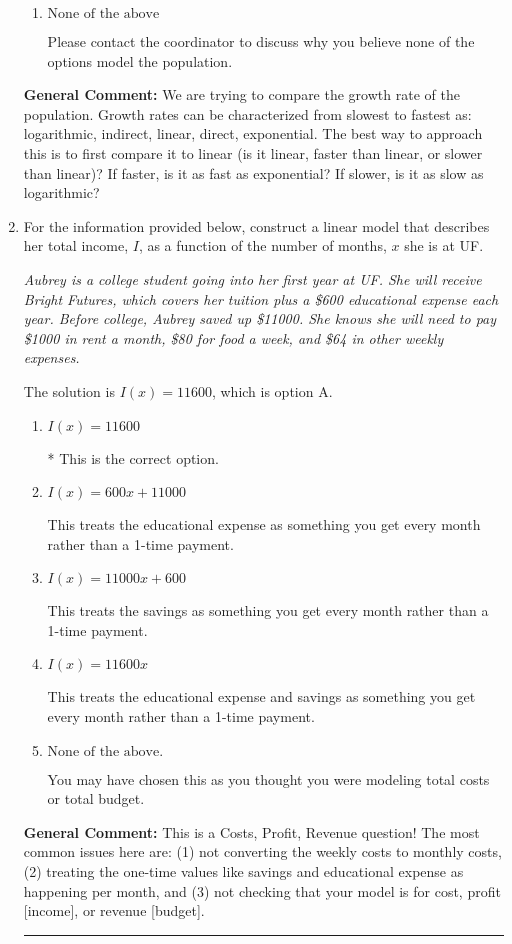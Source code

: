 \documentclass{extbook}[14pt]
\newcommand{\litem}[1]{\item #1

\rule{\textwidth}{0.4pt}}
\begin{document}
\begin{enumerate}
{\begin{enumerate}[label=\Alph*.]
This suggests the fastest of growths that we know.
\item \( \text{None of the above} \)

Please contact the coordinator to discuss why you believe none of the options model the population.
\end{enumerate}

\textbf{General Comment:} We are trying to compare the growth rate of the population. Growth rates can be characterized from slowest to fastest as: logarithmic, indirect, linear, direct, exponential. The best way to approach this is to first compare it to linear (is it linear, faster than linear, or slower than linear)? If faster, is it as fast as exponential? If slower, is it as slow as logarithmic?
}
\litem{
For the information provided below, construct a linear model that describes her total income, $I$, as a function of the number of months, $x$ she is at UF.

\begin{center}
    \textit{ Aubrey is a college student going into her first year at UF. She will receive Bright Futures, which covers her tuition plus a \$600 educational expense each year. Before college, Aubrey saved up \$11000. She knows she will need to pay \$1000 in rent a month, \$80 for food a week, and \$64 in other weekly expenses. }
\end{center}
The solution is \( I(x) = 11600 \), which is option A.\begin{enumerate}[label=\Alph*.]
\item \( I(x) = 11600 \)

* This is the correct option.
\item \( I(x) = 600 x + 11000 \)

This treats the educational expense as something you get every month rather than a 1-time payment.
\item \( I(x) = 11000 x + 600 \)

This treats the savings as something you get every month rather than a 1-time payment.
\item \( I(x) = 11600 x \)

This treats the educational expense and savings as something you get every month rather than a 1-time payment.
\item \( \text{None of the above.} \)

You may have chosen this as you thought you were modeling total costs or total budget.
\end{enumerate}

\textbf{General Comment:} This is a Costs, Profit, Revenue question! The most common issues here are: (1) not converting the weekly costs to monthly costs, (2) treating the one-time values like savings and educational expense as happening per month, and (3) not checking that your model is for cost, profit [income], or revenue [budget].
}
\end{enumerate}
\end{document}
